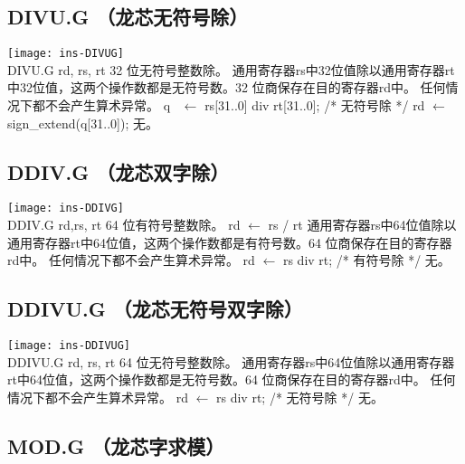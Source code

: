 \subsection{DIVU.G （龙芯无符号除）}

\begin{instructionblk}
  \texttt{[image: ins-DIVUG]} \\
  \instructionbody
  {DIVU.G rd, rs, rt}
  {32 位无符号整数除。}
  {通用寄存器rs中32位值除以通用寄存器rt中32位值，这两个操作数都是无符号数。32
  位商保存在目的寄存器rd中。 \fldnewline
  任何情况下都不会产生算术异常。}
  {q~ $\leftarrow$ rs[31..0] div rt[31..0]; /* 无符号除 */\newline
  rd $\leftarrow$ sign\_extend(q[31..0]);}
  {无。}
\end{instructionblk}

\subsection{DDIV.G （龙芯双字除）}

\begin{instructionblk}
  \texttt{[image: ins-DDIVG]} \\
  \instructionbody
  {DDIV.G rd,rs, rt}
  {64 位有符号整数除。}
  {rd $\leftarrow$ rs / rt \fldnewline
  通用寄存器rs中64位值除以通用寄存器rt中64位值，这两个操作数都是有符号数。64
  位商保存在目的寄存器rd中。 \fldnewline
  任何情况下都不会产生算术异常。}
  {rd $\leftarrow$ rs div rt; /* 有符号除 */}
  {无。}
\end{instructionblk}

\subsection{DDIVU.G （龙芯无符号双字除）}

\begin{instructionblk}
  \texttt{[image: ins-DDIVUG]} \\
  \instructionbody
  {DDIVU.G rd, rs, rt}
  {64 位无符号整数除。}
  {通用寄存器rs中64位值除以通用寄存器rt中64位值，这两个操作数都是无符号数。64
  位商保存在目的寄存器rd中。 \fldnewline
  任何情况下都不会产生算术异常。}
  {rd $\leftarrow$ rs div rt; /* 无符号除 */}
  {无。}
\end{instructionblk}

\subsection{MOD.G （龙芯字求模）}

